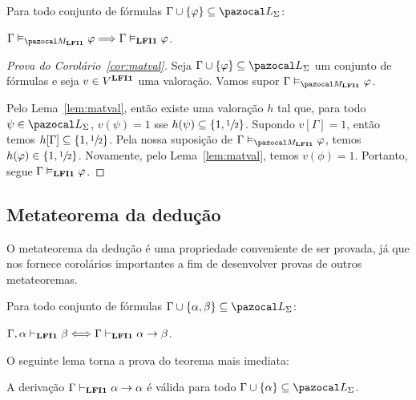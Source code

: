     \begin{corolario}\label{cor:matval}
        Para todo conjunto de fórmulas $\Gamma \cup \{\phi\} \subseteq \ling{}$:

        \centering
        $\Gamma \conmat \phi \Longrightarrow \Gamma \conval \phi$. 
    \end{corolario}

    \begin{proof}[Prova do Corolário~\ref{cor:matval}]
        Seja $\Gamma \cup \{\phi\} \subseteq \ling{}$ um conjunto de fórmulas e seja $v \in V^{{\normalfont\textbf{LFI1}}{}}$ uma valoração. Vamos supor $\Gamma \conmat \phi$.

        Pelo Lema~\ref{lem:matval}, então existe uma valoração $h$ tal que, para todo $\psi \in \ling{}$, $v(\psi) = 1$ sse $h(\psi) \subseteq \{1, \sfrac{1}{2}{}\}$. Supondo $v[\Gamma] = 1$, então temos $h[\Gamma] \subseteq \{1,\sfrac{1}{2}{}\}{}$. Pela nossa suposição de $\Gamma \conmat \phi$, temos $h(\varphi) \in \{1, \sfrac{1}{2}{}\}$. Novamente, pelo Lema~\ref{lem:matval}, temos $v(\phi) = 1$. Portanto, segue $\Gamma \vDash_{{\normalfont\textbf{LFI1}}{}} \varphi$.

    \end{proof}
    \subsection{Metateorema da dedução}\label{sec:mtd}
        O metateorema da dedução é uma propriedade conveniente de ser provada, já que nos fornece corolários importantes a fim de desenvolver provas de outros metateoremas.
        
        \begin{teorema}\label{teo:deducao}
            Para todo conjunto de fórmulas $\Gamma \cup \{\alpha, \beta \} \subseteq \ling{}$:

            \centering
            {\normalfont{} $\Gamma, \alpha \vdash_{{\normalfont\textbf{LFI1}}{}} \beta \Longleftrightarrow \Gamma \vdash_{{\normalfont\textbf{LFI1}}{}} \alpha \to \beta$.}
        \end{teorema}

        O seguinte lema torna a prova do teorema mais imediata:
        \begin{lema}\label{lem:id}
            A derivação $\Gamma \vdash_{{\normalfont\textbf{LFI1}}{}} \alpha \to \alpha$ é válida para todo $\Gamma \cup \{\alpha\} \subseteq \ling{}$.
        \end{lema}
        

